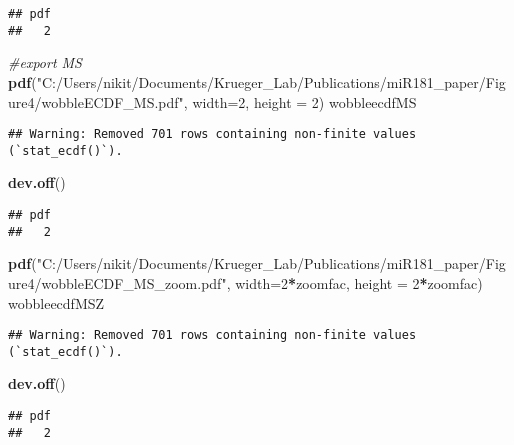 \documentclass[
]{article}
\newenvironment{Shaded}{\begin{snugshade}}{\end{snugshade}}
\newcommand{\AttributeTok}[1]{\textcolor[rgb]{0.13,0.29,0.53}{#1}}
\newcommand{\CommentTok}[1]{\textcolor[rgb]{0.56,0.35,0.01}{\textit{#1}}}
\newcommand{\DecValTok}[1]{\textcolor[rgb]{0.00,0.00,0.81}{#1}}
\newcommand{\FunctionTok}[1]{\textcolor[rgb]{0.13,0.29,0.53}{\textbf{#1}}}
\newcommand{\NormalTok}[1]{#1}
\newcommand{\SpecialCharTok}[1]{\textcolor[rgb]{0.81,0.36,0.00}{\textbf{#1}}}
\newcommand{\StringTok}[1]{\textcolor[rgb]{0.31,0.60,0.02}{#1}}
\begin{document}
\begin{verbatim}
## pdf 
##   2
\end{verbatim}

\begin{Shaded}
\begin{Highlighting}[]
\CommentTok{\#export MS}
\FunctionTok{pdf}\NormalTok{(}\StringTok{"C:/Users/nikit/Documents/Krueger\_Lab/Publications/miR181\_paper/Figure4/wobbleECDF\_MS.pdf"}\NormalTok{, }\AttributeTok{width=}\DecValTok{2}\NormalTok{, }\AttributeTok{height =} \DecValTok{2}\NormalTok{)}
\NormalTok{wobbleecdfMS}
\end{Highlighting}
\end{Shaded}

\begin{verbatim}
## Warning: Removed 701 rows containing non-finite values (`stat_ecdf()`).
\end{verbatim}

\begin{Shaded}
\begin{Highlighting}[]
\FunctionTok{dev.off}\NormalTok{()}
\end{Highlighting}
\end{Shaded}

\begin{verbatim}
## pdf 
##   2
\end{verbatim}

\begin{Shaded}
\begin{Highlighting}[]
\FunctionTok{pdf}\NormalTok{(}\StringTok{"C:/Users/nikit/Documents/Krueger\_Lab/Publications/miR181\_paper/Figure4/wobbleECDF\_MS\_zoom.pdf"}\NormalTok{, }\AttributeTok{width=}\DecValTok{2}\SpecialCharTok{*}\NormalTok{zoomfac, }\AttributeTok{height =} \DecValTok{2}\SpecialCharTok{*}\NormalTok{zoomfac)}
\NormalTok{wobbleecdfMSZ}
\end{Highlighting}
\end{Shaded}

\begin{verbatim}
## Warning: Removed 701 rows containing non-finite values (`stat_ecdf()`).
\end{verbatim}

\begin{Shaded}
\begin{Highlighting}[]
\FunctionTok{dev.off}\NormalTok{()}
\end{Highlighting}
\end{Shaded}

\begin{verbatim}
## pdf 
##   2
\end{verbatim}
\end{document}

